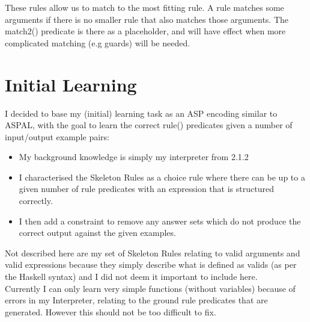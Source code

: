 

These rules allow us to match to the most fitting rule. A rule matches some arguments if there is no smaller rule that also matches those arguments. The match2() predicate is there as a placeholder, and will have effect when more complicated matching (e.g guards) will be needed.

\section{Initial Learning}

I decided to base my (initial) learning task as an ASP encoding similar to ASPAL, with the goal to learn the correct rule() predicates given a number of input/output example pairs:

\begin{itemize}
\item My background knowledge is simply my interpreter from 2.1.2
\item I characterised the Skeleton Rules as a choice rule where there can be up to a given number of rule predicates with an expression that is structured correctly. 

\item I then add a constraint to remove any answer sets which do not produce the correct output against the given examples.

\end{itemize}

Not described here are my set of Skeleton Rules relating to valid arguments and valid expressions because they simply describe what is defined as valids (as per the Haskell syntax) and I did not deem it important to include here.\\

Currently I can only learn very simple functions (without variables) because of errors in my Interpreter, relating to the ground rule predicates that are generated. However this should not be too difficult to fix. 

\pagebreak
%
%